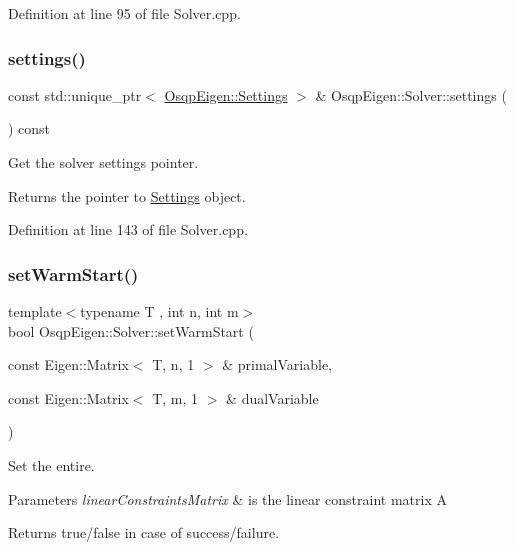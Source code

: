 Definition at line 95 of file Solver.\+cpp.

\mbox{\label{classOsqpEigen_1_1Solver_ad355be214417b0ccb1ec54913fe378c4}} 
\subsubsection{\texorpdfstring{settings()}{settings()}}
{\footnotesize\ttfamily const std\+::unique\+\_\+ptr$<$ \mbox{\hyperlink{classOsqpEigen_1_1Settings}{Osqp\+Eigen\+::\+Settings}} $>$ \& Osqp\+Eigen\+::\+Solver\+::settings (\begin{DoxyParamCaption}{ }\end{DoxyParamCaption}) const}



Get the solver settings pointer. 

\begin{DoxyReturn}{Returns}
the pointer to \mbox{\hyperlink{classOsqpEigen_1_1Settings}{Settings}} object. 
\end{DoxyReturn}


Definition at line 143 of file Solver.\+cpp.

\mbox{\label{classOsqpEigen_1_1Solver_a13f8e53aae03e483fa46066c7b93e066}} 
\subsubsection{\texorpdfstring{set\+Warm\+Start()}{setWarmStart()}}
{\footnotesize\ttfamily template$<$typename T , int n, int m$>$ \\
bool Osqp\+Eigen\+::\+Solver\+::set\+Warm\+Start (\begin{DoxyParamCaption}\item[{const Eigen\+::\+Matrix$<$ T, n, 1 $>$ \&}]{primal\+Variable,  }\item[{const Eigen\+::\+Matrix$<$ T, m, 1 $>$ \&}]{dual\+Variable }\end{DoxyParamCaption})}



Set the entire. 


\begin{DoxyParams}{Parameters}
{\em linear\+Constraints\+Matrix} & is the linear constraint matrix A \\
\hline
\end{DoxyParams}
\begin{DoxyReturn}{Returns}
true/false in case of success/failure. 
\end{DoxyReturn}


